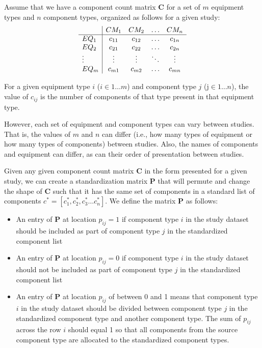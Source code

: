 \documentclass[11pt]{report}
\begin{document}
{{{{Assume that we have a component count matrix $\textbf{C}$ for a set of $m$ equipment types and $n$ component types, organized as follows for a given study:
\begin{equation}
\begin{array}{l | cccc} 
		     	&	CM_1		& CM_2 		&	\ldots&	 CM_n \\
			\hline
EQ_1			&	c_{11}	& c_{12}		&	\ldots&	c_{1n} \\
EQ_2			&	c_{21}	& c_{22}		&	\ldots&	c_{2n} \\
\vdots		&\vdots		& \vdots		& 	\ddots&	\vdots \\
EQ_m		&	c_{m1}	& c_{m2}		&	\ldots	 &	c_{mn}
\end{array}
\end{equation}


For a given equipment type $i$ ($i \in 1 \ldots m$) and component type $j$ (j$\in 1 \ldots n$), the value of $c_{ij}$ is the number of components of that type present in that equipment type.

However, each set of equipment and component types can vary between studies. That is, the values of $m$ and $n$ can differ (i.e., how many types of equipment or how many types of components) between studies. Also, the names of components and equipment can differ, as can their order of presentation between studies. 

Given any given component count matrix $\textbf{C}$ in the form presented for a given study, we can create a standardization matrix $\textbf{P}$ that will permute and change the shape of $\textbf{C}$ such that it has the same set of components in a standard list of components $c^* = [c_1^*, c_2^*, c_3^* \ldots c_n^*]$.  We define the matrix $\textbf{P}$ as follows:
\begin{itemize}
\item An entry of $\textbf{P}$ at location $p_{ij} = 1$ if component type $i$ in the study dataset should be included as part of component type $j$ in the standardized component list
\item An entry of $\textbf{P}$ at location $p_{ij} = 0$ if component type $i$ in the study dataset should not be included as part of component type $j$ in the standardized component list
\item An entry of $\textbf{P}$ at location $p_{ij}$ of between 0 and 1 means that component type $i$ in the study dataset should be divided between component type $j$ in the standardized component type and another component type. The sum of $p_{ij}$ across the row $i$ should equal 1 so that all components from the source component type are allocated to the standardized component types.
\end{itemize}

}}}}
\end{document}
